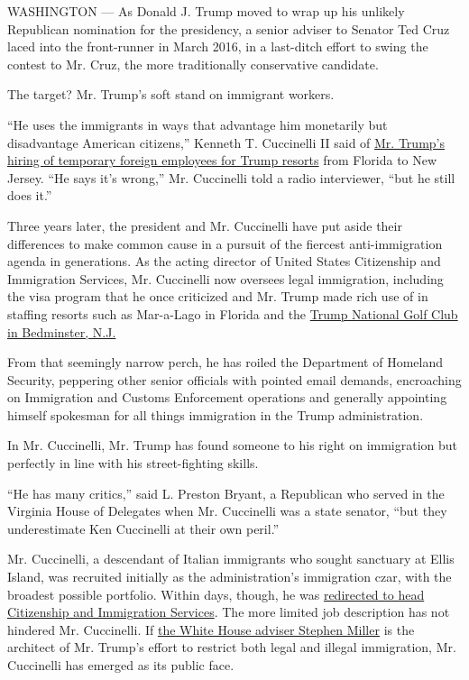 WASHINGTON --- As Donald J. Trump moved to wrap up his unlikely
Republican nomination for the presidency, a senior adviser to Senator
Ted Cruz laced into the front-runner in March 2016, in a last-ditch
effort to swing the contest to Mr. Cruz, the more traditionally
conservative candidate.

The target? Mr. Trump's soft stand on immigrant workers.

``He uses the immigrants in ways that advantage him monetarily but
disadvantage American citizens,'' Kenneth T. Cuccinelli II said of
\href{https://www.nytimes3xbfgragh.onion/2016/02/26/us/politics/donald-trump-taps-foreign-work-force-for-his-florida-club.html}{Mr.
Trump's hiring of temporary foreign employees for Trump resorts} from
Florida to New Jersey. ``He says it's wrong,'' Mr. Cuccinelli told a
radio interviewer, ``but he still does it.''

Three years later, the president and Mr. Cuccinelli have put aside their
differences to make common cause in a pursuit of the fiercest
anti-immigration agenda in generations. As the acting director of United
States Citizenship and Immigration Services, Mr. Cuccinelli now oversees
legal immigration, including the visa program that he once criticized
and Mr. Trump made rich use of in staffing resorts such as Mar-a-Lago in
Florida and the
\href{https://www.nytimes3xbfgragh.onion/2018/12/06/us/trump-bedminster-golf-undocumented-workers.html}{Trump
National Golf Club in Bedminster, N.J.}

From that seemingly narrow perch, he has roiled the Department of
Homeland Security, peppering other senior officials with pointed email
demands, encroaching on Immigration and Customs Enforcement operations
and generally appointing himself spokesman for all things immigration in
the Trump administration.

In Mr. Cuccinelli, Mr. Trump has found someone to his right on
immigration but perfectly in line with his street-fighting skills.

``He has many critics,'' said L. Preston Bryant, a Republican who served
in the Virginia House of Delegates when Mr. Cuccinelli was a state
senator, ``but they underestimate Ken Cuccinelli at their own peril.''

Mr. Cuccinelli, a descendant of Italian immigrants who sought sanctuary
at Ellis Island, was recruited initially as the administration's
immigration czar, with the broadest possible portfolio. Within days,
though, he was
\href{https://www.nytimes3xbfgragh.onion/2019/05/24/us/politics/kenneth-cuccinelli-l-francis-cissna.html}{redirected
to head Citizenship and Immigration Services}. The more limited job
description has not hindered Mr. Cuccinelli. If
\href{https://www.nytimes3xbfgragh.onion/2019/08/17/us/politics/stephen-miller-immigration-trump.html}{the
White House adviser Stephen Miller} is the architect of Mr. Trump's
effort to restrict both legal and illegal immigration, Mr. Cuccinelli
has emerged as its public face.

